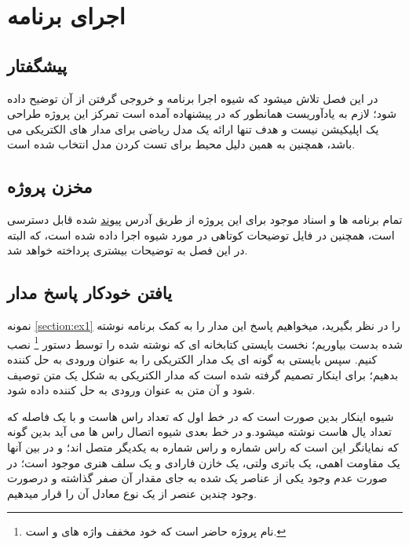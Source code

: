 \chapter{اجرای برنامه}
\section{پیشگفتار} 
در این فصل تلاش میشود که شیوه اجرا برنامه و خروجی گرفتن از آن توضیح داده شود؛
لازم به یادآوریست همانطور که در پیشنهاده آمده است تمرکز این پروژه طراحی یک اپلیکیشن نیست و هدف تنها ارائه یک مدل ریاضی برای مدار های الکتریکی می باشد، همچنین به همین دلیل محیط
برای تست کردن مدل انتخاب شده است.
\section{مخزن پروژه}
تمام برنامه ها و اسناد موجود برای این پروژه از طریق آدرس 
\href{https://github.com/Mehrdadghassabi/Gracc}{پیوند}
شده قابل دسترسی است، همچنین در فایل
توضیحات کوتاهی در مورد شیوه اجرا داده شده است، که البته در این فصل به توضیحات بیشتری پرداخته خواهد شد.
\section{یافتن خودکار پاسخ مدار}
\label{section:atm}
نمونه
\ref{section:ex1}
را در نظر بگیرید، میخواهیم پاسخ این مدار را به کمک برنامه نوشته شده بدست بیاوریم؛
نخست بایستی کتابخانه ای که نوشته شده را توسط دستور
\footnote{
	نام پروژه حاضر است که خود مخفف واژه های
	و
	است.
}
نصب کنیم.
سپس بایستی به گونه ای یک مدار الکتریکی را به عنوان ورودی به حل کننده بدهیم؛
برای اینکار تصمیم گرفته شده است که مدار الکتریکی به شکل یک متن توصیف شود و آن متن به عنوان ورودی به حل کننده داده شود.

شیوه اینکار بدین صورت است که در خط اول
که تعداد راس هاست و با یک فاصله
که تعداد یال هاست نوشته میشود.و در
خط بعدی شیوه اتصال راس ها می آید بدین گونه که
نمایانگر این است که راس شماره
و راس شماره
به یکدیگر متصل اند؛ و در بین آنها یک
مقاومت 
اهمی،
یک باتری
ولتی،
یک خازن
فارادی
و یک سلف
هنری موجود است؛
در صورت عدم وجود یکی از عناصر یک شده به جای مقدار آن صفر گذاشته و درصورت وجود چندین عنصر از یک نوع معادل آن را قرار میدهیم.

